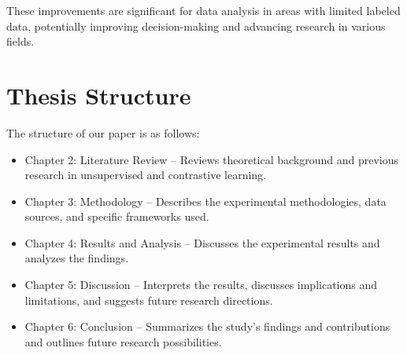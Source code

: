 These improvements are significant for data analysis in areas with limited labeled data, potentially improving decision-making and advancing research in various fields.

\section{Thesis Structure}
The structure of our paper is as follows:

\begin{itemize}
    \item Chapter 2: Literature Review – Reviews theoretical background and previous research in unsupervised and contrastive learning.
    \item Chapter 3: Methodology – Describes the experimental methodologies, data sources, and specific frameworks used.
    \item Chapter 4: Results and Analysis – Discusses the experimental results and analyzes the findings.
    \item Chapter 5: Discussion – Interprets the results, discusses implications and limitations, and suggests future research directions.
    \item Chapter 6: Conclusion – Summarizes the study's findings and contributions and outlines future research possibilities.
\end{itemize}